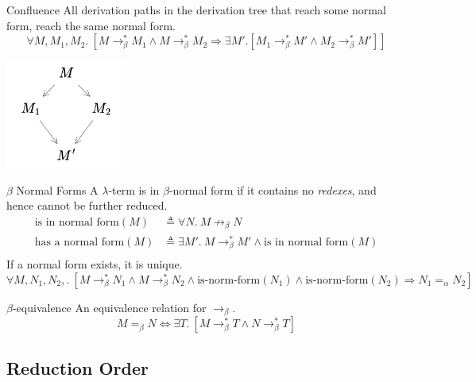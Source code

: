 \begin{definitionbox}{Confluence}
All derivation paths in the derivation tree that reach some normal form, reach the same normal form.
\[\forall M, M_1, M_2. \ [M \to^*_\beta M_1 \land M \to^*_\beta M_2 \Rightarrow \exists M'. [M_1 \to^*_\beta M' \land M_2 \to^*_\beta M']]\]
    \begin{center}
        \includegraphics[width=0.3\textwidth]{lambda_calculus/images/confluence.drawio.png}
    \end{center}
\end{definitionbox}

\begin{definitionbox}{$\beta$ Normal Forms}
A $\lambda$-term is in $\beta$-normal form if it contains no \textit{redexes}, and hence cannot be further reduced.
\[\begin{split}
		\text{is in normal form}(M) &\triangleq \forall N. \ M \not\to_\beta N \\
		\text{has a normal form}(M) &\triangleq \exists M'. \ M \to^*_\beta M' \land \text{is in normal form}(M) \\
	\end{split}\]
If a normal form exists, it is unique.
\[\forall M, N_1, N_2, . \ [M \to^*_\beta N_1 \land M \to^*_\beta N_2 \land \text{is-norm-form}(N_1) \land \text{is-norm-form}(N_2) \Rightarrow N_1 =_\alpha N_2]\]
\end{definitionbox}
\begin{definitionbox}{$\beta$-equivalence}
An equivalence relation for $\to_\beta$.
\[M =_\beta N \Leftrightarrow \exists T. \ [M \to^*_\beta T \land N \to^*_\beta T]\]
\end{definitionbox}

\subsection{Reduction Order}

